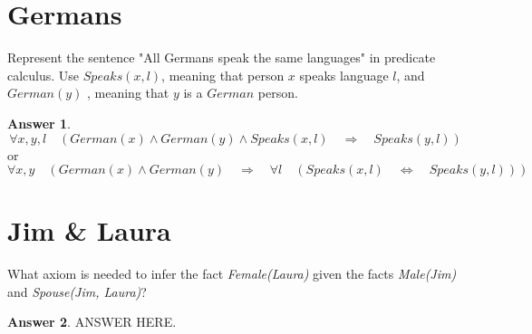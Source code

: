 \documentclass[a4paper]{article}
\renewcommand{\(}{\left(}
\renewcommand{\)}{\right)}
\theoremstyle{plain}
\theoremstyle{plain}
\theoremstyle{definition}
\newtheorem*{answer}{Answer}
\begin{document}
\section{Germans}
 Represent the sentence "All Germans speak the same
languages" in predicate calculus. Use $Speaks(x,l)$, meaning that person $x$ speaks
language $l$, and $German(y)$ , meaning that $y$ is a $German$ person.
\begin{shaded}
\begin{answer}
\begin{equation*}
  \forall x , y , l \quad \left(German(x) \wedge German(y) \wedge Speaks (x,l) \quad \Rightarrow \quad Speaks(y,l) \right)
\end{equation*}
or
\begin{equation*}
  \forall x , y \quad \left(German(x) \wedge German(y)   \quad \Rightarrow \quad \forall l \quad (Speaks (x,l) \quad \Leftrightarrow \quad Speaks(y,l)) \right)
\end{equation*}

\end{answer}
\end{shaded}

\section{Jim \& Laura}
What axiom is needed to infer the fact \textit{Female(Laura)} given the facts \textit{Male(Jim)} and \textit{Spouse(Jim, Laura)}?

\begin{shaded}
\begin{answer}
ANSWER HERE.
\end{answer}
\end{shaded}
\end{document}
